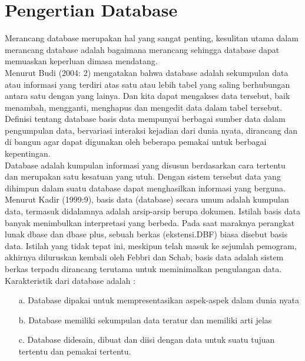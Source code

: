 \documentclass{jtetiproposalskripsi}
\begin{document}
\section{Pengertian Database}
Merancang database merupakan hal yang sangat penting, kesulitan utama dalam merancang database adalah bagaimana merancang sehingga database dapat memuaskan keperluan dimasa mendatang.
\\
Menurut Budi (2004: 2) mengatakan bahwa database adalah sekumpulan data atau informasi yang terdiri atas satu atau lebih tabel yang saling berhubungan antara satu dengan yang  lainya.  Dan  kita  dapat  mengakses  data  tersebut,  baik  menambah,  mengganti, menghapus dan mengedit data dalam tabel tersebut.
\\
Definisi tentang database basis data mempunyai berbagai sumber data dalam pengumpulan data, bervariasi interaksi kejadian dari dunia nyata, dirancang dan di bangun agar dapat digunakan oleh beberapa pemakai untuk berbagai kepentingan.
\\
Database adalah kumpulan informasi yang disusun berdasarkan cara tertentu dan merupakan satu kesatuan yang utuh. Dengan sistem tersebut data yang dihimpun dalam suatu database dapat menghasilkan informasi yang berguna.
\\
Menurut Kadir (1999:9), basis data (database) secara umum  adalah kumpulan data, termasuk didalamnya adalah arsip-arsip berupa dokumen. Istilah basis data banyak menimbulkan interpretasi yang berbeda. Pada saat maraknya perangkat lunak dbase   dan dbase  plus, sebuah berkas (ekstensi.DBF) biasa disebut basis data. Istilah yang tidak tepat ini, meskipun telah masuk ke sejumlah pemogram, akhirnya diluruskan kembali oleh Febbri dan Schab, basis data adalah sistem berkas terpadu dirancang terutama untuk meminimalkan pengulangan data.
\\
Karakteristik dari database adalah :
\begin{itemize}
\item[a.]Database dipakai untuk mempresentasikan aspek-aspek dalam dunia nyata 
\item[b.]Database memiliki sekumpulan data teratur dan memiliki arti jelas
\item[c.]Database didesain, dibuat dan diisi dengan data untuk suatu tujuan tertentu dan pemakai tertentu. 
\end{itemize}
\end{document}

